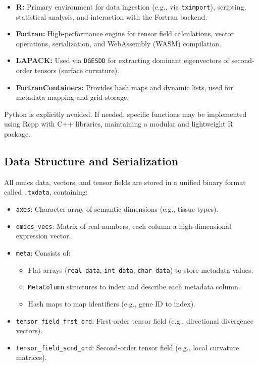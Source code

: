 \documentclass[11pt]{article}
\begin{document}
\begin{itemize}[leftmargin=1.5em]
    \item \textbf{R:} Primary environment for data ingestion (e.g., via \texttt{tximport}), scripting, statistical analysis, and interaction with the Fortran backend.
    \item \textbf{Fortran:} High-performance engine for tensor field calculations, vector operations, serialization, and WebAssembly (WASM) compilation.
    \item \textbf{LAPACK:} Used via \texttt{DGESDD} for extracting dominant eigenvectors of second-order tensors (surface curvature).
    \item \textbf{FortranContainers:} Provides hash maps and dynamic lists, used for metadata mapping and grid storage.
\end{itemize}

Python is explicitly avoided. If needed, specific functions may be implemented using Rcpp with C++ libraries, maintaining a modular and lightweight R package.

\subsection{Data Structure and Serialization}

All omics data, vectors, and tensor fields are stored in a unified binary format called \texttt{.txdata}, containing:

\begin{itemize}[leftmargin=1.5em]
    \item \texttt{axes}: Character array of semantic dimensions (e.g., tissue types).
    \item \texttt{omics\_vecs}: Matrix of real numbers, each column a high-dimensional expression vector.
    \item \texttt{meta}: Consists of:
    \begin{itemize}
        \item Flat arrays (\texttt{real\_data}, \texttt{int\_data}, \texttt{char\_data}) to store metadata values.
        \item \texttt{MetaColumn} structures to index and describe each metadata column.
        \item Hash maps to map identifiers (e.g., gene ID to index).
    \end{itemize}
    \item \texttt{tensor\_field\_frst\_ord}: First-order tensor field (e.g., directional divergence vectors).
    \item \texttt{tensor\_field\_scnd\_ord}: Second-order tensor field (e.g., local curvature matrices).
\end{itemize}
\end{document}

